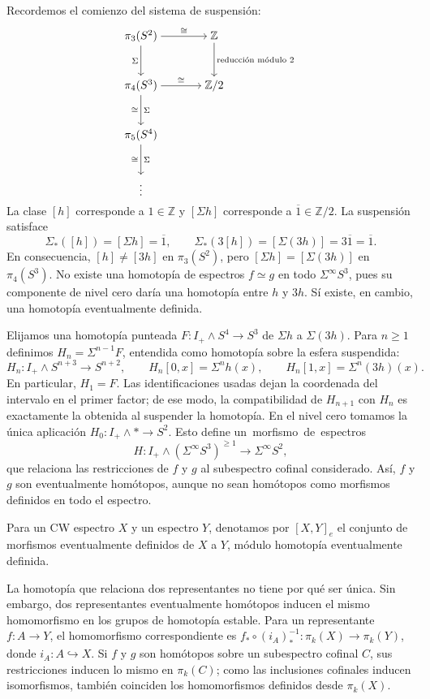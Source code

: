 Recordemos el comienzo del sistema de suspensión:
\[
\begin{tikzcd}[cramped,column sep=large,row sep=large]
\pi_3(S^2) \arrow[r,"\cong"] \arrow[d,"\Sigma"']
& \mathbb Z \arrow[d,"\text{reducción módulo }2"]\\
\pi_4(S^3) \arrow[r,"\cong"] \arrow[d,"\Sigma","\cong"']
& \mathbb Z/2\\
\pi_5(S^4) \arrow[d,"\Sigma","\cong"'] &\\
\vdots &
\end{tikzcd}
\]
La clase $[h]$ corresponde a $1\in\mathbb Z$ y $[\Sigma h]$ corresponde a $\overline1\in\mathbb Z/2$. La suspensión satisface
\[
\Sigma_*([h])=[\Sigma h]=\overline1,\qquad
\Sigma_*(3[h])=[\Sigma(3h)]=3\overline1=\overline1.
\]
En consecuencia, $[h]\ne[3h]$ en $\pi_3(S^2)$, pero $[\Sigma h]=[\Sigma(3h)]$ en $\pi_4(S^3)$. No existe una homotopía de espectros $f\simeq g$ en todo $\Sigma^\infty S^3$, pues su componente de nivel cero daría una homotopía entre $h$ y $3h$. Sí existe, en cambio, una homotopía eventualmente definida.

Elijamos una homotopía punteada $F\colon I_+\wedge S^4\to S^3$ de $\Sigma h$ a $\Sigma(3h)$. Para $n\ge1$ definimos $H_n=\Sigma^{n-1}F$, entendida como homotopía sobre la esfera suspendida:
\[
H_n\colon I_+\wedge S^{n+3}\longrightarrow S^{n+2},\qquad
H_n[0,x]=\Sigma^nh(x),\qquad
H_n[1,x]=\Sigma^n(3h)(x).
\]
En particular, $H_1=F$. Las identificaciones usadas dejan la coordenada del intervalo en el primer factor; de ese modo, la compatibilidad de $H_{n+1}$ con $H_n$ es exactamente la obtenida al suspender la homotopía. En el nivel cero tomamos la única aplicación $H_0\colon I_+\wedge *\to S^2$. Esto define \mbox{un morfismo de espectros}
\[
H\colon I_+\wedge(\Sigma^\infty S^3)^{\ge1}
\longrightarrow\Sigma^\infty S^2,
\]
que relaciona las restricciones de $f$ y $g$ al subespectro cofinal considerado. Así, $f$ y $g$ son eventualmente homótopos, aunque no sean homótopos como morfismos definidos en todo el espectro.

\begin{defi}\label{defi:c11-clases-eventuales}
Para un CW espectro $X$ y un espectro $Y$, denotamos por $[X,Y]_e$ el conjunto de morfismos eventualmente definidos de $X$ a $Y$, módulo homotopía eventualmente definida.
\end{defi}

La homotopía que relaciona dos representantes no tiene por qué ser única. Sin embargo, dos representantes eventualmente homótopos inducen el mismo homomorfismo en los grupos de homotopía estable. Para un representante $f\colon A\to Y$, el homomorfismo correspondiente es $f_*\circ(i_A)_*^{-1}\colon\pi_k(X)\to\pi_k(Y)$, donde $i_A\colon A\hookrightarrow X$. Si $f$ y $g$ son homótopos sobre un subespectro cofinal $C$, sus restricciones inducen lo mismo en $\pi_k(C)$; como las inclusiones cofinales inducen isomorfismos, también coinciden los homomorfismos definidos desde $\pi_k(X)$.


